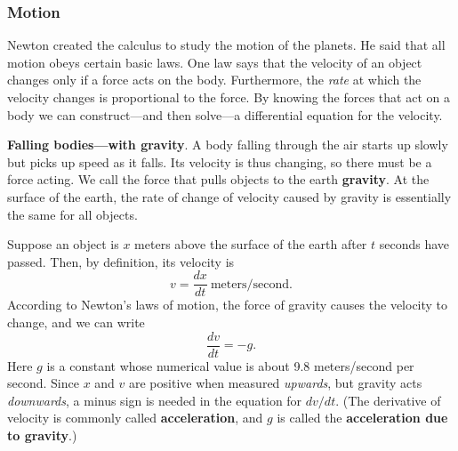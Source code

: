 \subsubsection{Motion}
\label{subsubsec:motion}

Newton created the calculus to study the motion of the planets.  He
said that all motion obeys certain basic laws.  One law says that the
velocity of an object changes only if a force acts on the body.
Furthermore, the {\em rate\/} at which the velocity changes is
proportional to the force.  By knowing the forces that act on a body
we can construct---and then solve---a differential equation for the
velocity.





{\bf Falling bodies---with gravity}. A body
falling through the air starts up slowly but picks up speed as it
falls.  Its velocity is thus changing, so there must be a force
acting.  We call the force that pulls objects to the earth {\bf
  gravity}. At the surface of the earth, the rate
of change of velocity caused by gravity is essentially the same for
all objects.

Suppose an object is $x$ meters above the surface of the earth after
$t$ seconds have passed.  Then, by definition, its velocity is
	\[
v = \dfrac{dx}{dt} \ \mbox{meters/second}.
\]
According to Newton's laws of motion, the force of gravity causes the velocity to change, and we can write
	\[
\dfrac{dv}{dt} = -g.
\]
Here $g$ is a constant whose numerical value is about 9.8 meters/second per second.  Since $x$ and $v$ are positive when measured {\em upwards}, but gravity acts {\em downwards}, a minus sign is needed in the equation for $dv/dt$.  (The derivative of velocity is commonly called {\bf acceleration}, and $g$ is called the {\bf acceleration due to gravity}.)


